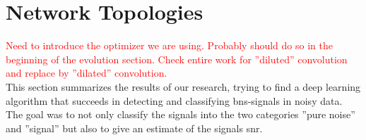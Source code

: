 \section{Network Topologies}\label{sec:network_topologies}
\textcolor{red}{Need to introduce the optimizer we are using. Probably should do so in the beginning of the evolution section. Check entire work for ''diluted'' convolution and replace by ''dilated'' convolution.}\\
This section summarizes the results of our research, trying to find a deep learning algorithm that succeeds in detecting and classifying \gls{bns}-signals in noisy data. The goal was to not only classify the signals into the two categories ''pure noise'' and ''signal'' but also to give an estimate of the signals \gls{snr}.\\

